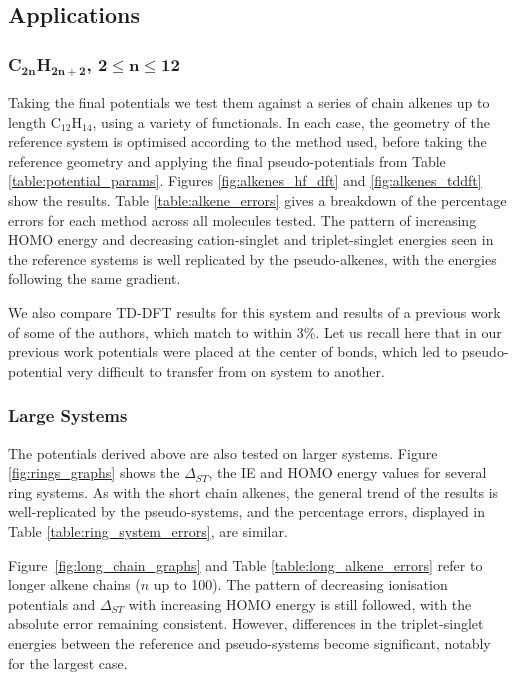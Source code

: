 \documentclass[12pt]{article}
\begin{document}
\subsection*{\sffamily \large Applications}

\subsubsection*{\sffamily \large C\(\mathbf{_{2n}}\)H\(\mathbf{_{2n+2}}\), \(\mathbf{2 \leq n \leq 12}\)}

Taking the final potentials we test them against a series of chain alkenes up to length C\(_{12}\)H\(_{14}\), using a variety of functionals. In each case, the geometry of the reference system is optimised according to the method used, 
before taking the reference geometry and applying the final pseudo-potentials from Table \ref{table:potential_params}. 
Figures \ref{fig:alkenes_hf_dft} and \ref{fig:alkenes_tddft} show the results. Table \ref{table:alkene_errors} gives a breakdown of the percentage errors for each method across all molecules tested. The pattern of increasing HOMO energy and decreasing cation-singlet and triplet-singlet energies seen in the reference systems is well replicated by the pseudo-alkenes, with the energies following the same gradient.

We also compare TD-DFT results for this system and results of a previous work of some of the authors, which match to within 3\%.\cite{drujon_pseudopotentials_2013}
Let us recall here that in our previous work potentials were placed at the center of bonds, which led to
pseudo-potential very difficult to transfer from on system to another.

\subsubsection*{\sffamily \large Large Systems}

The potentials derived above are also tested on larger systems.
Figure \ref{fig:rings_graphs} shows the $\Delta_{ST}$, the IE and
HOMO energy values for several ring systems.
As with the short chain alkenes, the general trend of the results is well-replicated
by the pseudo-systems, and the percentage errors, displayed in Table
\ref{table:ring_system_errors}, are similar.

Figure~\ref{fig:long_chain_graphs} and Table \ref{table:long_alkene_errors} refer to longer 
alkene chains (\(n\) up to 100).
The pattern of decreasing ionisation potentials and $\Delta_{ST}$ with increasing HOMO
energy is still followed, with the absolute error remaining consistent.
However, differences in the triplet-singlet energies between the reference and pseudo-systems 
become significant, notably for the largest case.
\end{document}
